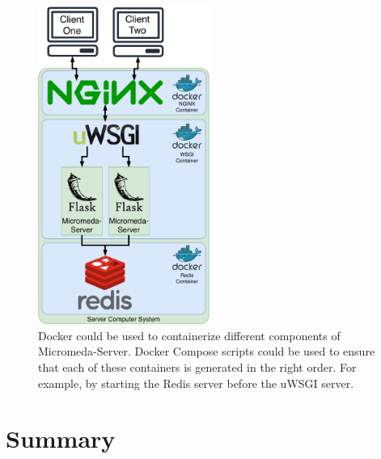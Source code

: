 \begin{figure}[!ht]
  \centering
	\includegraphics[width=0.5\textwidth]{media/micromeda-server-docker.pdf}
	 \caption{Docker could be used to containerize different components of Micromeda-Server. Docker Compose scripts could be used to ensure that each of these containers is generated in the right order. For example, by starting the Redis server before the uWSGI server.}
	 \label{fig:micromeda-docker}
\end{figure}

\section{Summary}

